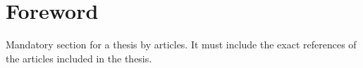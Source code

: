\chapter*{Foreword}

Mandatory section for a thesis by articles. It must include the exact
references of the articles included in the thesis.
